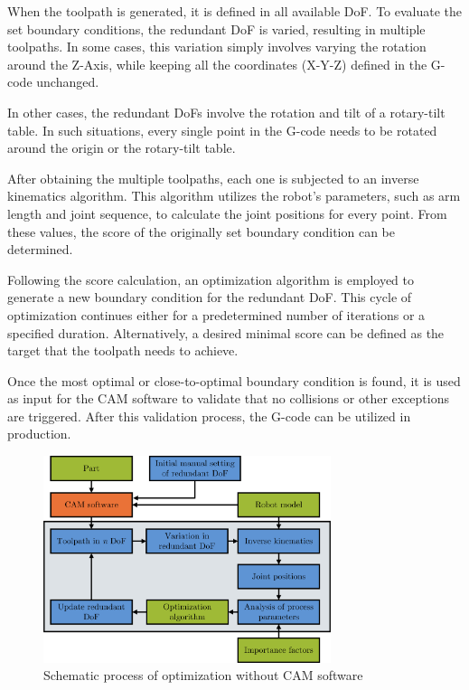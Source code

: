 When the toolpath is generated, it is defined in all available \acrshort{DoF}. To evaluate the set boundary conditions, the redundant \acrshort{DoF} is varied, resulting in multiple toolpaths. In some cases, this variation simply involves varying the rotation around the Z-Axis, while keeping all the coordinates (X-Y-Z) defined in the G-code unchanged.

In other cases, the redundant \acrshort{DoF}s involve the rotation and tilt of a rotary-tilt table. In such situations, every single point in the G-code needs to be rotated around the origin or the rotary-tilt table.

After obtaining the multiple toolpaths, each one is subjected to an inverse kinematics algorithm. This algorithm utilizes the robot's parameters, such as arm length and joint sequence, to calculate the joint positions for every point. From these values, the score of the originally set boundary condition can be determined.

Following the score calculation, an optimization algorithm is employed to generate a new boundary condition for the redundant \acrshort{DoF}. This cycle of optimization continues either for a predetermined number of iterations or a specified duration. Alternatively, a desired minimal score can be defined as the target that the toolpath needs to achieve.
 

Once the most optimal or close-to-optimal boundary condition is found, it is used as input for the \acrshort{CAM} software to validate that no collisions or other exceptions are triggered. After this validation process, the G-code can be utilized in production.

\begin{figure}[H]
	\centerline{\includegraphics[width=0.75\textwidth]{figures/noCAM.png}}
	\caption{Schematic process of optimization without CAM software}
	\label{noCAM}
\end{figure}

